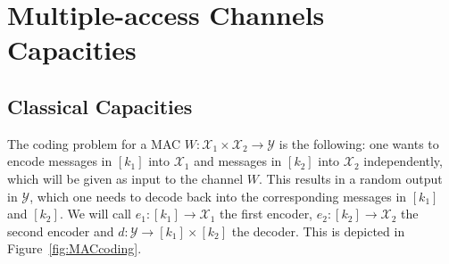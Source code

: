 \section{Multiple-access Channels Capacities}
\label{section:capacity}
\subsection{Classical Capacities}
 

The coding problem for a MAC $W : \mathcal{X}_1 \times \mathcal{X}_2 \rightarrow \mathcal{Y}$ is the following: one wants to encode messages in $[k_1]$ into $\mathcal{X}_1$ and messages in $[k_2]$ into $\mathcal{X}_2$ independently, which will be given as input to the channel $W$. This results in a random output in $\mathcal{Y}$, which one needs to decode back into the corresponding messages in $[k_1]$ and $[k_2]$. We will call $e_1 : [k_1] \rightarrow \mathcal{X}_1$ the first encoder, $e_2 : [k_2] \rightarrow \mathcal{X}_2$ the second encoder and $d : \mathcal{Y} \rightarrow [k_1] \times [k_2]$ the decoder. This is depicted in Figure~\ref{fig:MACcoding}.


